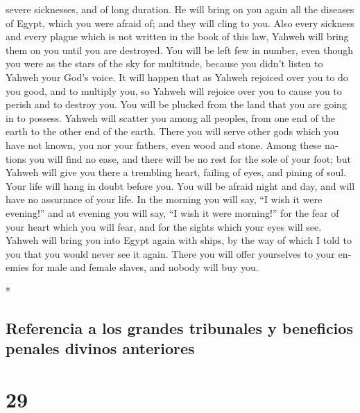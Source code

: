 \begin{paracol}{2}
\begin{otherlanguage}{english}
severe sicknesses, and of long duration.  He will bring
on you again all the diseases of Egypt, which you were afraid of; and
they will cling to you.  Also every sickness and every
plague which is not written in the book of this law, Yahweh will bring
them on you until you are destroyed.  You will be left
few in number, even though you were as the stars of the sky for
multitude, because you didn't listen to Yahweh your God's voice.
 It will happen that as Yahweh rejoiced over you to do
you good, and to multiply you, so Yahweh will rejoice over you to cause
you to perish and to destroy you. You will be plucked from the land that
you are going in to possess.  Yahweh will scatter you
among all peoples, from one end of the earth to the other end of the
earth. There you will serve other gods which you have not known, you nor
your fathers, even wood and stone.  Among these nations
you will find no ease, and there will be no rest for the sole of your
foot; but Yahweh will give you there a trembling heart, failing of eyes,
and pining of soul.  Your life will hang in doubt before
you. You will be afraid night and day, and will have no assurance of
your life.  In the morning you will say, ``I wish it were
evening!'' and at evening you will say, ``I wish it were morning!'' for
the fear of your heart which you will fear, and for the sights which
your eyes will see.  Yahweh will bring you into Egypt
again with ships, by the way of which I told to you that you would never
see it again. There you will offer yourselves to your enemies for male
and female slaves, and nobody will buy you.

\end{otherlanguage}

\switchcolumn[0]*

\hypertarget{referencia-a-los-grandes-tribunales-y-beneficios-penales-divinos-anteriores}{%
\subsection{Referencia a los grandes tribunales y beneficios penales
divinos
anteriores}\label{referencia-a-los-grandes-tribunales-y-beneficios-penales-divinos-anteriores}}

\hypertarget{section-56}{%
\section{29}\label{section-56}}


\end{paracol}
